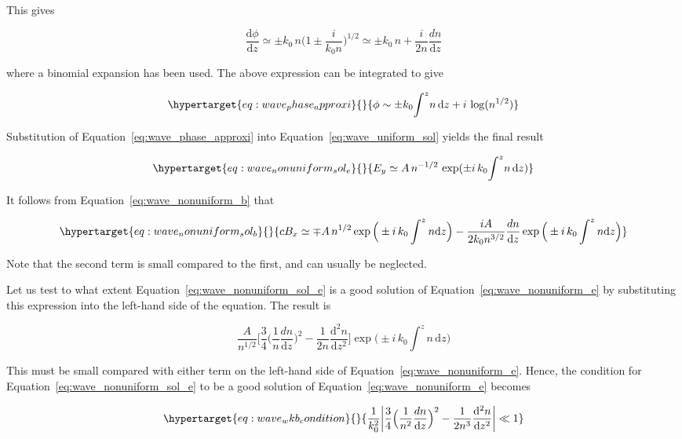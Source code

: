 \documentclass[
  notoc %
]{tufte-book}
\begin{document}
This gives

\[
\frac{\mathrm{d}\phi}{\mathrm{d}z} \simeq \pm k_0\,n\Big(1\pm \frac{i}{k_0 n}\Big)^{1/2}\simeq \pm k_0\,n + \frac{i}{2n}\frac{dn}{\mathrm{d}z}
\]

where a binomial expansion has been used. The above expression can be
integrated to give

\begin{equation}\protect\hypertarget{eq:wave_phase_approxi}{}{
\phi \sim \pm k_0\! \int^z \!n\,\mathrm{d}z +i\,\log(n^{1/2})
}\label{eq:wave_phase_approxi}\end{equation}

Substitution of Equation~\ref{eq:wave_phase_approxi} into
Equation~\ref{eq:wave_uniform_sol} yields the final result

\begin{equation}\protect\hypertarget{eq:wave_nonuniform_sol_e}{}{
E_y \simeq A\,n^{-1/2}\,\exp (\pm i\, k_0\! \int^z \!n\,\mathrm{d}z )
}\label{eq:wave_nonuniform_sol_e}\end{equation}

It follows from Equation~\ref{eq:wave_nonuniform_b} that

\begin{equation}\protect\hypertarget{eq:wave_nonuniform_sol_b}{}{
cB_x\simeq \mp A\, n^{1/2}\exp\Big(\pm i\,k_0 \int^z n \mathrm{d}z\Big) - \frac{iA}{2k_0 n^{3/2}}\frac{dn}{\mathrm{d}z}\exp\Big(\pm i\,k_0 \int^z n \mathrm{d}z\Big)
}\label{eq:wave_nonuniform_sol_b}\end{equation}

Note that the second term is small compared to the first, and can
usually be neglected.

Let us test to what extent Equation~\ref{eq:wave_nonuniform_sol_e} is a
good solution of Equation~\ref{eq:wave_nonuniform_e} by substituting
this expression into the left-hand side of the equation. The result is

\[
\frac{A}{n^{1/2}}\Big[ \frac{3}{4}\Big(\frac{1}{n}\frac{dn}{\mathrm{d}z}\Big)^2 - \frac{1}{2n}\frac{\mathrm{d}^2n}{\mathrm{d}z^2} \Big]\exp\Big( \pm i\,k_0\int^z n\,\mathrm{d}z\Big)
\]

This must be small compared with either term on the left-hand side of
Equation~\ref{eq:wave_nonuniform_e}. Hence, the condition for
Equation~\ref{eq:wave_nonuniform_sol_e} to be a good solution of
Equation~\ref{eq:wave_nonuniform_e} becomes

\begin{equation}\protect\hypertarget{eq:wave_wkb_condition}{}{
\frac{1}{k_0^2}\bigg\lvert \frac{3}{4}\Big(\frac{1}{n^2} \frac{dn}{\mathrm{d}z}\Big)^2 -\frac{1}{2n^3}\frac{\mathrm{d}^2 n}{\mathrm{d}z^2}\bigg\rvert \ll 1
}\label{eq:wave_wkb_condition}\end{equation}
\end{document}
